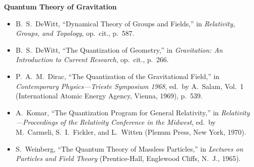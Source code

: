 \medskip
\noindent\textbf{Quantum Theory of Gravitation}\par
\begin{itemize}
  \item[\(\square\)] B.~S.~DeWitt, ``Dynamical Theory of Groups and
  Fields,'' in \emph{Relativity, Groups, and Topology}, op.\ cit., p.~587.

  \item[\(\square\)] B.~S.~DeWitt, ``The Quantization of Geometry,'' in
  \emph{Gravitation: An Introduction to Current Research}, op.\ cit.,
  p.~266.

  \item[\(\square\)] P.~A.~M.~Dirac, ``The Quantization of the Gravitational
  Field,'' in \emph{Contemporary Physics---Trieste Symposium 1968}, ed.\ by
  A.~Salam, Vol.~1 (International Atomic Energy Agency, Vienna, 1969),
  p.~539.

  \item[\(\square\)] A.~Komar, ``The Quantization Program for General
  Relativity,'' in \emph{Relativity---\hspace{0pt}Proceedings of the Relativity
  Conference in the Midwest}, ed.\ by M.~Carmeli, S.~I.~Fickler, and
  L.~Witten (Plenum Press, New York, 1970).

  \item[\(\square\)] S.~Weinberg, ``The Quantum Theory of Massless
  Particles,'' in \emph{Lectures on Particles and Field Theory}
  (Prentice-Hall, Englewood Cliffs, N.~J., 1965).
\end{itemize}


